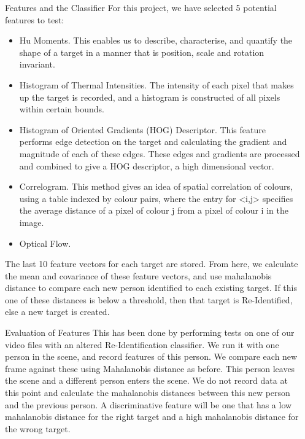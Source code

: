 \documentclass[final]{beamer}
\begin{document}
\begin{frame}{}
\begin{columns}[t]
\begin{column}{.48\linewidth}
        
      \end{column}


      \begin{column}{.48\linewidth}
        \begin{block}{Features and the Classifier}
        For this project, we have selected 5 potential features to test:
          \begin{itemize}
          \item Hu Moments. 
          This enables us to describe, characterise, and quantify the shape of a target in a manner that is position, scale and rotation invariant.
          \item Histogram of Thermal Intensities. The intensity of each pixel that makes up the target is recorded, and a histogram is constructed of all pixels within certain bounds.
          \item Histogram of Oriented Gradients (HOG) Descriptor. This feature performs edge detection on the target and calculating the gradient and magnitude of each of these edges. These edges and gradients are processed and combined to give a HOG descriptor, a high dimensional vector. 
          \item Correlogram. This method gives an idea of spatial correlation of colours, using a table indexed by colour pairs, where the  entry for <i,j>
  specifies the average distance of a pixel of colour j from a pixel of colour i
  in the image.
          \item Optical Flow.
          \end{itemize}
          The last 10 feature vectors for each target are stored. From here, we calculate the mean and covariance of these feature vectors, and use mahalanobis distance to compare each new person identified to each existing target. If this one of these distances is below a threshold, then that target is Re-Identified, else a new target is created.  
        \end{block}

        \begin{block}{Evaluation of Features}
         This has been done by performing tests on one of our video files with an altered Re-Identification classifier. We run it with one person in the scene, and record features of this person. We compare each new frame against these using Mahalanobis distance as before. This person leaves the scene and a different person enters the scene. We do not record data at this point and calculate the mahalanobis distances between this new person and the previous person. A discriminative feature will be one that has a low mahalanobis distance for the right target and a high mahalanobis distance for the wrong target. 
        \end{block}


\end{column}
\end{columns}
\end{frame}
\end{document}
